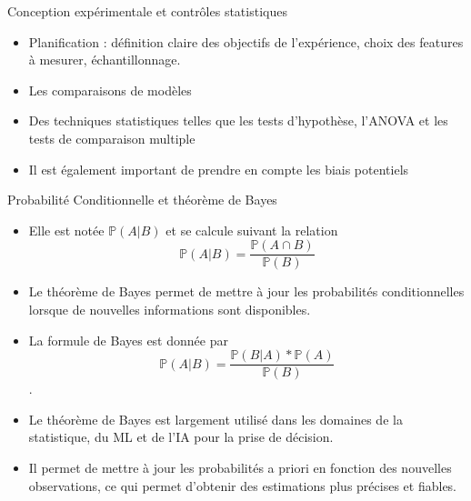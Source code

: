 \documentclass{beamer}
\begin{document}
\begin{frame}{Conception expérimentale et contrôles statistiques}
	\begin{itemize}

		\item Planification : définition claire des objectifs de l'expérience, choix des features à mesurer, échantillonnage.
		\item Les comparaisons de modèles
		\item Des techniques statistiques telles que les tests d'hypothèse, l'ANOVA et les tests de comparaison multiple 
		\item Il est également important de prendre en compte les biais potentiels	
	\end{itemize}
\end{frame}




\begin{frame}{Probabilité Conditionnelle et théorème de Bayes}
	\begin{itemize}
		
		\item Elle est notée $\mathbb{P}(A | B)$ et se calcule suivant la relation $$\mathbb{P}(A | B) = \frac{\mathbb{P}(A\cap B)}{\mathbb{P}(B)}$$
		\item Le théorème de Bayes permet de mettre à jour les probabilités conditionnelles lorsque de nouvelles informations sont disponibles.
		\item La formule de Bayes est donnée par  $$\mathbb{P}(A | B) = \frac{\mathbb{P}(B | A) * \mathbb{P}(A)}{\mathbb{P}(B)} $$.
		\item Le théorème de Bayes est largement utilisé dans les domaines de la statistique, du ML et de l'IA pour la prise de décision.
		\item Il permet de mettre à jour les probabilités a priori en fonction des nouvelles observations, ce qui permet d'obtenir des estimations plus précises et fiables.

	\end{itemize}
\end{frame}
\end{document}
